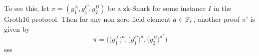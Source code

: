 To see this, let $\pi=(g_1^A, g_1^C, g_2^B)$ be a zk-Snark for some instance $I$ in the Groth16 protocol. Then for any non zero field element $a\in\mathbb{F}_r$, another proof $\pi'$ is given by
\begin{equation}
\pi=\Big(\Big(g_1^A\Big)^a, \Big(g_1^C\Big)^a, \Big(g_2^B\Big)^{a^2}\Big)
\end{equation}  
sss










